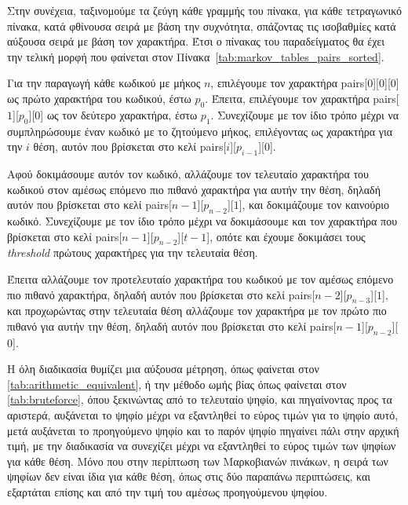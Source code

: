 \documentclass[11pt]{article}
\begin{document}
Στην συνέχεια, ταξινομούμε τα ζεύγη κάθε γραμμής του πίνακα, για κάθε τετραγωνικό πίνακα, κατά φθίνουσα σειρά με βάση την συχνότητα, σπάζοντας τις ισοβαθμίες κατά αύξουσα σειρά με βάση τον χαρακτήρα. Έτσι ο πίνακας του παραδείγματος θα έχει την τελική μορφή που φαίνεται στον Πίνακα~\ref{tab:markov_tables_pairs_sorted}.



Για την παραγωγή κάθε κωδικού με μήκος $n$, επιλέγουμε τον χαρακτήρα pairs[$0$][$0$][$0$] ως πρώτο χαρακτήρα του κωδικού, έστω $p_0$. Έπειτα, επιλέγουμε τον χαρακτήρα pairs[$1$][$p_0$][$0$] ως τον δεύτερο χαρακτήρα, έστω $p_1$. Συνεχίζουμε με τον ίδιο τρόπο μέχρι να συμπληρώσουμε έναν κωδικό με το ζητούμενο μήκος, επιλέγοντας ως χαρακτήρα για την $i$ θέση, αυτόν που βρίσκεται στο κελί pairs[$i$][$p_{i-1}$][$0$].

Αφού δοκιμάσουμε αυτόν τον κωδικό, αλλάζουμε τον τελευταίο χαρακτήρα του κωδικού στον αμέσως επόμενο πιο πιθανό χαρακτήρα για αυτήν την θέση, δηλαδή αυτόν που βρίσκεται στο κελί pairs[$n-1$][$p_{n-2}$][$1$], και δοκιμάζουμε τον καινούριο κωδικό. Συνεχίζουμε με τον ίδιο τρόπο μέχρι να δοκιμάσουμε και τον χαρακτήρα που βρίσκεται στο κελί pairs[$n-1$][$p_{n-2}$][$t-1$], οπότε και έχουμε δοκιμάσει τους \textit{threshold} πρώτους χαρακτήρες για την τελευταία θέση.

Έπειτα αλλάζουμε τον προτελευταίο χαρακτήρα του κωδικού με τον αμέσως επόμενο πιο πιθανό χαρακτήρα, δηλαδή αυτόν που βρίσκεται στο κελί pairs[$n-2$][$p_{n-3}$][$1$], και προχωρώντας στην τελευταία θέση αλλάζουμε τον χαρακτήρα με τον πρώτο πιο πιθανό για αυτήν την θέση, δηλαδή αυτόν που βρίσκεται στο κελί pairs[$n-1$][$p_{n-2}$][$0$].

Η όλη διαδικασία θυμίζει μια αύξουσα μέτρηση, όπως φαίνεται στον \autoref{tab:arithmetic_equivalent}, ή την μέθοδο ωμής βίας όπως φαίνεται στον \autoref{tab:bruteforce}, όπου ξεκινώντας από το τελευταίο ψηφίο, και πηγαίνοντας προς τα αριστερά, αυξάνεται το ψηφίο μέχρι να εξαντληθεί το εύρος τιμών για το ψηφίο αυτό, μετά αυξάνεται το προηγούμενο ψηφίο και το παρόν ψηφίο πηγαίνει πάλι στην αρχική τιμή, με την διαδικασία να συνεχίζει μέχρι να εξαντληθεί το εύρος τιμών των ψηφίων για κάθε θέση. Μόνο που στην περίπτωση των Μαρκοβιανών πινάκων, η σειρά των ψηφίων δεν είναι ίδια για κάθε θέση, όπως στις δύο παραπάνω περιπτώσεις, και εξαρτάται επίσης και από την τιμή του αμέσως προηγούμενου ψηφίου.
\end{document}
